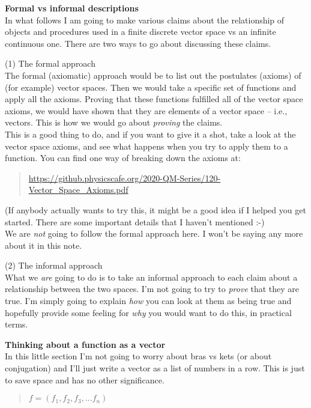 \documentclass{article}
\newcommand{\head}[1]{ \vspace{12pt} {\bf #1} \vspace{-12pt}\\ }
\newcommand{\nbhead}[1]{ \vspace{12pt} {#1} \vspace{-12pt}\\ }
\def\p{ \vspace{10pt}\\ }
\begin{document}
\head{Formal vs informal descriptions}

In what follows I am going to make various claims about the relationship
of objects and procedures used in a finite discrete vector space vs an
infinite continuous one. There are two ways to go about discussing these
claims. 

\nbhead{(1) The formal approach}

The formal (axiomatic) approach would be to list out the postulates (axioms)
of (for example) vector spaces. Then we would take a specific set of functions
and apply all the axioms. Proving that these functions fulfilled all of
the vector space axioms, we would have shown that they are elements of a
vector space -- i.e., vectors. This is how we would go about {\it proving}
the claims. 
\p
This is a good thing to do, and if you want to give it a shot, take a look
at the vector space axioms, and see what happens when you try to apply them
to a function. You can find one way of breaking down the axioms at:
\begin{quote}
\href{
https://github.physicscafe.org/2020-QM-Series/120-Vector\_Space\_Axioms.pdf}
{https://github.physicscafe.org/2020-QM-Series/120-Vector\_Space\_Axioms.pdf}
\end{quote}

(If anybody actually wants to try this, it might be a good idea if I helped
you get started. There are some important details that I haven't mentioned :-)
\p
We are {\it not} going to follow the formal approach here. I won't be
saying any more about it in this note.

\nbhead{(2) The informal approach}

What we {\it are} going to do is to take an informal approach to each claim
about a relationship between the two spaces. I'm not going to try to
{\it prove} that they are true. I'm simply going to explain {\it how} you can
look at them as being true and hopefully provide some feeling for {\it why}
you would want to do this, in practical terms. 

\head{Thinking about a function as a vector}

In this little section I'm not going to worry about bras vs kets (or about 
conjugation) and I'll just write a vector as a list of numbers in a row.
This is just to save space and has no other significance.

\begin{quote}
$f = \left( f_1, f_2, f_3, ... f_n\right)$
\end{quote}
\end{document}
